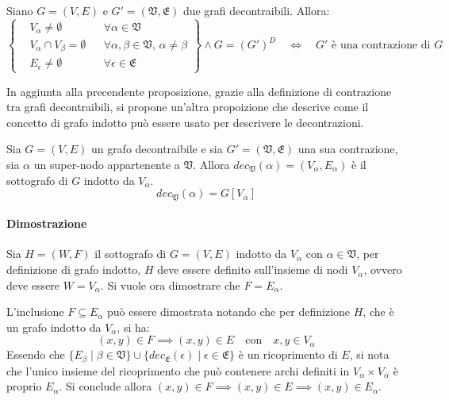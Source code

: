     \begin{proposition}
        Siano $G = (V, E)$ e $G' = (\mathfrak{V}, \mathfrak{E})$ due grafi decontraibili. Allora:
        \begin{equation*}
            \left\{
            \begin{aligned}
                &V_\alpha \neq \emptyset  &&\forall \alpha \in \mathfrak{V} \\
                &V_{\alpha} \cap V_{\beta} = \emptyset &&\forall \alpha, \beta \in \mathfrak{V}, \, \alpha \neq \beta \\
                &E_{\epsilon} \neq \emptyset  &&\forall \epsilon \in \mathfrak{E}
            \end{aligned}
            \right\}
            \land G = (G')^D \quad \Longleftrightarrow \quad G' \text{ è una contrazione di } G
        \end{equation*}
    \end{proposition}

    In aggiunta alla precendente proposizione, grazie alla definizione di contrazione tra grafi decontraibili,
    si propone un'altra propoizione che descrive come il concetto di grafo indotto pu\`o essere usato per descrivere
    le decontrazioni.

    \begin{proposition}
    Sia $G=(V, E)$ un grafo decontraibile e sia $G' = (\mathfrak{V}, \mathfrak{E})$ una sua contrazione,
    sia $\alpha$ un super-nodo appartenente a $\mathfrak{V}$.
    Allora $dec_{\mathfrak{V}}(\alpha) = (V_\alpha, E_\alpha)$ \`e il sottografo di $G$ indotto da $V_\alpha$.
    \begin{equation*}
        dec_{\mathfrak{V}}(\alpha) = G[V_\alpha]
    \end{equation*}
    \end{proposition}

    \paragraph{Dimostrazione}
    Sia $H = (W, F)$ il sottografo di $G = (V, E)$ indotto da $V_\alpha$ con
    $\alpha \in \mathfrak{V}$, per definizione di grafo indotto, $H$ deve essere definito sull'insieme di nodi
    $V_\alpha$, ovvero deve essere $W = V_\alpha$.
    Si vuole ora dimostrare che $F = E_\alpha$. \newline

    L'inclusione $F \subseteq E_\alpha$ pu\`o essere dimostrata notando che per definizione $H$,
    che \`e un grafo indotto da $V_\alpha$, si ha:
    \begin{equation*}
    (x, y) \in F \implies (x, y) \in E \quad \text{con} \quad x, y \in V_{\alpha}
    \end{equation*}
    Essendo che $\{ E_\beta \mid \beta \in \mathfrak{V}\}
    \cup \{ dec_{\mathfrak{E}}(\epsilon) \mid \epsilon \in \mathfrak{E}\}$ \`e un ricoprimento di $E$, si nota che
    l'unico insieme del ricoprimento che pu\`o contenere archi definiti in $V_\alpha \times V_\alpha$
    \`e proprio $E_\alpha$. Si conclude allora $(x, y) \in F \implies (x, y) \in E \implies (x, y) \in E_\alpha $.
    \newline

